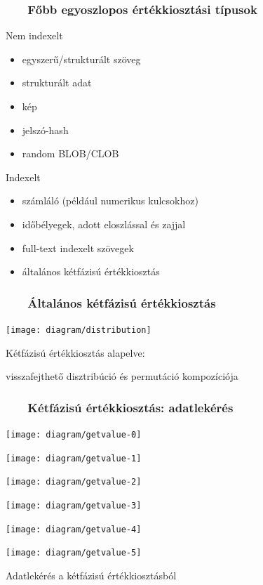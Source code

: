 \documentclass[
]{beamer}
\newcommand{\slidetitle}[2]{\frametitle{{\small #1 ~ \ding{226} ~ } \normalsize \textbf{#2} }}
\begin{document}
\begin{frame}
    \slidetitle{\sectionshorttitle}{Főbb egyoszlopos értékkiosztási típusok}

    Nem indexelt
    
    \begin{itemize}
        \item egyszerű/strukturált szöveg
        \item strukturált adat
        \item kép
        \item jelszó-hash
        \item random BLOB/CLOB
    \end{itemize}
    
    Indexelt
    
    \begin{itemize}
        \item számláló (például numerikus kulcsokhoz)
        \item időbélyegek, adott eloszlással és zajjal
        \item full-text indexelt szövegek
        \item {  { általános kétfázisú értékkiosztás } }
    \end{itemize}
    
\end{frame}

\begin{frame}
    \slidetitle{\sectionshorttitle}{Általános kétfázisú értékkiosztás}
    
    \centering
    
    \texttt{[image: diagram/distribution]}
    
    Kétfázisú értékkiosztás alapelve: \par
    visszafejthető disztribúció és permutáció kompozíciója
\end{frame}

\begin{frame}
    \slidetitle{\sectionshorttitle}{Kétfázisú értékkiosztás: adatlekérés}
    
    \centering
    
    \begin{overprint}
        \centerline{\texttt{[image: diagram/getvalue-0]}}
        \centerline{\texttt{[image: diagram/getvalue-1]}}
        \centerline{\texttt{[image: diagram/getvalue-2]}}
        \centerline{\texttt{[image: diagram/getvalue-3]}}
        \centerline{\texttt{[image: diagram/getvalue-4]}}
        \centerline{\texttt{[image: diagram/getvalue-5]}}
    \end{overprint}
    
    \hspace{0.7cm}
    
    Adatlekérés a kétfázisú értékkiosztásból
\end{frame}
\end{document}
